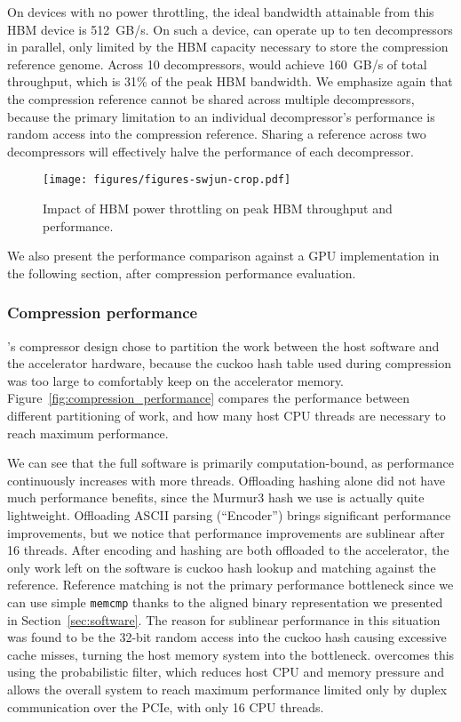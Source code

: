 On devices with no power throttling, the ideal bandwidth attainable from this HBM device is 512~GB/s.
On such a device, \name{} can operate up to ten decompressors in parallel, only limited by the HBM capacity necessary to store the compression reference genome.
Across 10 decompressors, \name{} would achieve 160~GB/s of total throughput, which is 31\% of the peak HBM bandwidth.
We emphasize again that the compression reference cannot be shared across multiple decompressors, because the primary limitation to an individual decompressor's performance is random access into the compression reference.
Sharing a reference across two decompressors will effectively halve the performance of each decompressor.

\begin{figure}[htb]
    \centering
    \texttt{[image: figures/figures-swjun-crop.pdf]}
    \caption{Impact of HBM power throttling on peak HBM throughput and \name{} performance.}
    \label{fig:throttled_bancroft}
\end{figure}

We also present the performance comparison against a GPU implementation in the following section, after compression performance evaluation.

\subsubsection{Compression performance}
\name{}'s compressor design chose to partition the work between the host software and the accelerator hardware, because the cuckoo hash table used during compression was too large to comfortably keep on the accelerator memory.
Figure~\ref{fig:compression_performance} compares the performance between different partitioning of work, and how many host CPU threads are necessary to reach maximum performance.

We can see that the full software is primarily computation-bound, as performance continuously increases with more threads.
Offloading hashing alone did not have much performance benefits, since the Murmur3 hash we use is actually quite lightweight.
Offloading ASCII parsing (``Encoder'') brings significant performance improvements, but we notice that performance improvements are sublinear after 16 threads.
After encoding and hashing are both offloaded to the accelerator, the only work left on the software is cuckoo hash lookup and matching against the reference.
Reference matching is not the primary performance bottleneck since we can use simple \texttt{memcmp} thanks to the aligned binary representation we presented in Section~\ref{sec:software}.
The reason for sublinear performance in this situation was found to be the 32-bit random access into the cuckoo hash causing excessive cache misses, turning the host memory system into the bottleneck.
\name{} overcomes this using the probabilistic filter, which reduces host CPU and memory pressure and allows the overall system to reach maximum performance limited only by duplex communication over the PCIe, with only 16 CPU threads.


